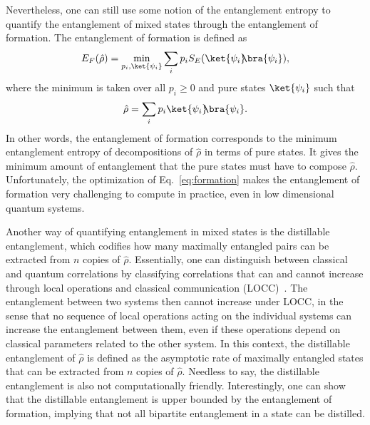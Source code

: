 \documentclass[letterpaper,12pt,titlepage,oneside,final]{book}
\begin{document}
Nevertheless, one can still use some notion of the entanglement entropy to quantify the entanglement of mixed states through the entanglement of formation. The entanglement of formation is defined as
\begin{equation}\label{eq:formation}
    E_F(\hat{\rho}) = \min_{p_i,\ket{\psi_i}}\sum_i p_i S_E(\ket{\psi_i}\!\!\bra{\psi_i}),
\end{equation}
where the minimum is taken over all $p_i\geq 0$ and pure states $\ket{\psi_i}$ such that
\begin{equation}
    \hat{\rho} = \sum_i p_i \ket{\psi_i}\!\!\bra{\psi_i}.
\end{equation}
In other words, the entanglement of formation corresponds to the minimum entanglement entropy of decompositions of $\hat{\rho}$ in terms of pure states. It gives the minimum amount of entanglement that the pure states must have to compose $\hat{\rho}$. Unfortunately, the optimization of Eq.~\eqref{eq:formation} makes the entanglement of formation very challenging to compute in practice, even in low dimensional quantum systems.

Another way of quantifying entanglement in mixed states is the distillable entanglement, which codifies how many maximally entangled pairs can be extracted from $n$ copies of $\hat{\rho}$. Essentially,  one can distinguish between classical and quantum correlations by classifying correlations that can and cannot increase through local operations and classical communication (LOCC)~\cite{monotones,LOCC}. The entanglement between two systems then cannot increase under LOCC, in the sense that no sequence of local operations acting on the individual systems can increase the entanglement between them, even if these operations depend on classical parameters related to the other system. In this context, the distillable entanglement of $\hat{\rho}$ is defined as the asymptotic rate of maximally entangled states that can be extracted from $n$ copies of $\hat{\rho}$. Needless to say, the distillable entanglement is also not computationally friendly. Interestingly, one can show that the distillable entanglement is upper bounded by the entanglement of formation, implying that not all bipartite entanglement in a state can be distilled. 
\end{document}
